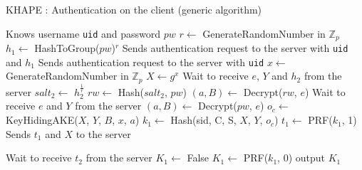 ﻿\documentclass[../report.tex]{subfiles}
\begin{document}
\begin{algorithm}[h]
\caption{KHAPE : Authentication on the client (generic algorithm)}
\label{alg:login_client}
\begin{algorithmic}
\Require Knows username \verb|uid| and password $pw$
    \State $r \gets$ GenerateRandomNumber in $\mathbb{Z}_p$
    \State $h_1 \gets$ HashToGroup($pw$)$^r$
    \State Sends authentication request to the server with \verb|uid| and $h_1$
\Else
    \State Sends authentication request to the server with \verb|uid|
\EndIf
\State $x \gets$ GenerateRandomNumber in $\mathbb{Z}_p$
\State $X \gets g^x$
    \State Wait to receive $e$, $Y$ and $h_2$ from the server
    \State $salt_2 \gets$ $h_2^{\frac{1}{r}}$
    \State $rw \gets$ Hash($salt_2$, $pw$)
    \State $(a, B) \gets$ Decrypt($rw$, $e$)
\Else
    \State Wait to receive $e$ and $Y$ from the server
    \State $(a, B) \gets$ Decrypt($pw$, $e$)
\EndIf
\State $o_c \gets$ KeyHidingAKE($X$, $Y$, $B$, $x$, $a$)
\State $k_1 \gets$ Hash(sid, C, S, $X$, $Y$, $o_c$)
\State $t_1 \gets$ PRF($k_1$, 1)
\State Sends $t_1$ and $X$ to the server

\State Wait to receive $t_2$ from the server
    \State $K_1 \gets$ False
\Else
    \State $K_1 \gets$ PRF($k_1$, 0)
\EndIf
\State output $K_1$
\end{algorithmic}
\end{algorithm}
\end{document}
